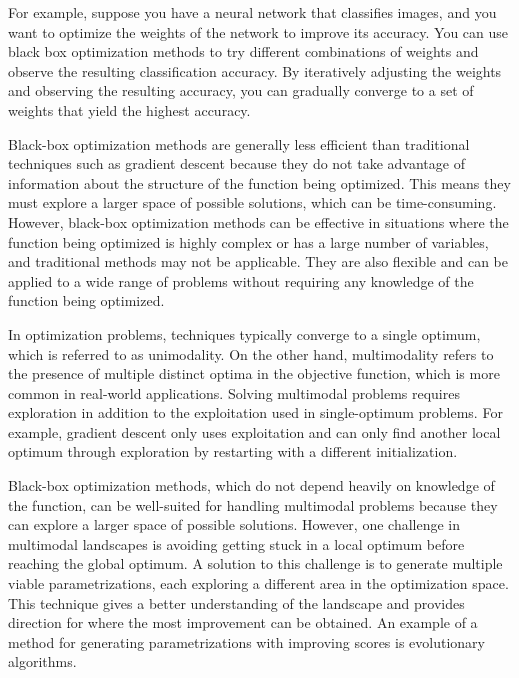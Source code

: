 For example, suppose you have a neural network that classifies images, and you want to optimize the weights of the network to improve its accuracy. You can use black box optimization methods to try different combinations of weights and observe the resulting classification accuracy. By iteratively adjusting the weights and observing the resulting accuracy, you can gradually converge to a set of weights that yield the highest accuracy. 

Black-box optimization methods are generally less efficient than traditional techniques such as gradient descent because they do not take advantage of information about the structure of the function being optimized. This means they must explore a larger space of possible solutions, which can be time-consuming. However, black-box optimization methods can be effective in situations where the function being optimized is highly complex or has a large number of variables, and traditional methods may not be applicable. They are also flexible and can be applied to a wide range of problems without requiring any knowledge of the function being optimized.

In optimization problems, techniques typically converge to a single optimum, which is referred to as unimodality. On the other hand, multimodality refers to the presence of multiple distinct optima in the objective function, which is more common in real-world applications. Solving multimodal problems requires exploration in addition to the exploitation used in single-optimum problems. For example, gradient descent only uses exploitation and can only find another local optimum through exploration by restarting with a different initialization.

Black-box optimization methods, which do not depend heavily on knowledge of the function, can be well-suited for handling multimodal problems because they can explore a larger space of possible solutions. However, one challenge in multimodal landscapes is avoiding getting stuck in a local optimum before reaching the global optimum. A solution to this challenge is to generate multiple viable parametrizations, each exploring a different area in the optimization space. This technique gives a better understanding of the landscape and provides direction for where the most improvement can be obtained. An example of a method for generating parametrizations with improving scores is evolutionary algorithms.

